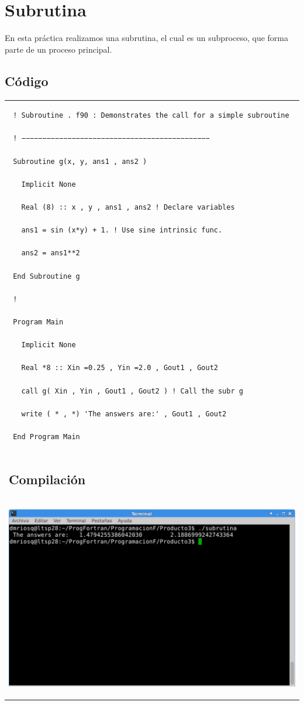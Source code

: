 \documentclass[10pt]{article}
\begin{document}
\section{Subrutina}
En esta práctica realizamos una subrutina, el cual es un subproceso, que forma parte de un proceso principal.
\subsection{Código}
\begin{tabular}{l}
 \begin{verbatim}  
 ! Subroutine . f90 : Demonstrates the call for a simple subroutine

 ! −−−−−−−−−−−−−−−−−−−−−−−−−−−−−−−−−−−−−−−−−−−−−

 Subroutine g(x, y, ans1 , ans2 )

   Implicit None

   Real (8) :: x , y , ans1 , ans2 ! Declare variables

   ans1 = sin (x*y) + 1. ! Use sine intrinsic func.

   ans2 = ans1**2

 End Subroutine g

 !

 Program Main  

   Implicit None

   Real *8 :: Xin =0.25 , Yin =2.0 , Gout1 , Gout2

   call g( Xin , Yin , Gout1 , Gout2 ) ! Call the subr g

   write ( * , *) 'The answers are:' , Gout1 , Gout2

 End Program Main
\end{verbatim} \\
\subsection{Compilación}\\

\begin{center}
   \includegraphics[scale=0.4]{S}
\end{center}
\end{tabular}







\end{document}
